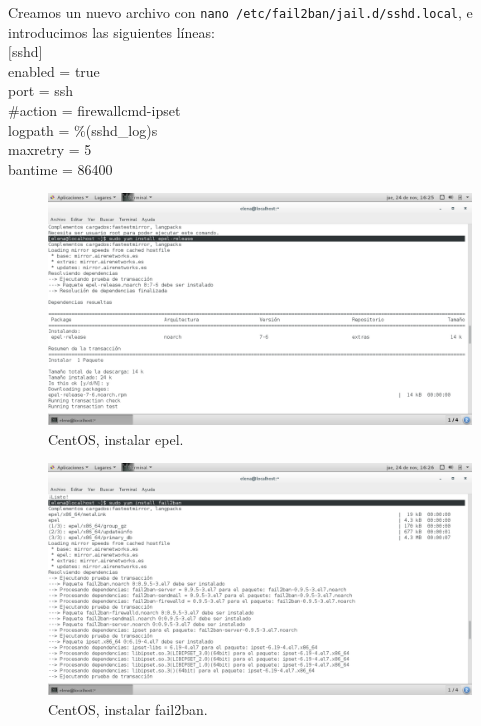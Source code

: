 Creamos un nuevo archivo con \texttt{nano /etc/fail2ban/jail.d/sshd.local}, e introducimos las siguientes líneas:\\
$[$sshd$]$\\
enabled = true\\
port = ssh\\
\#action = firewallcmd-ipset\\
logpath = \%(sshd\_log)s\\
maxretry = 5\\
bantime = 86400\\

\begin{figure}[H] 
	\centering
	\includegraphics[width=15cm]{./img/opcional2a.png} 	
	\caption{CentOS, instalar epel.} \label{fig:opcional2a}
\end{figure}

\begin{figure}[H] 
	\centering
	\includegraphics[width=15cm]{./img/opcional2b.png} 	
	\caption{CentOS, instalar fail2ban.} \label{fig:opcional2b}
\end{figure}


